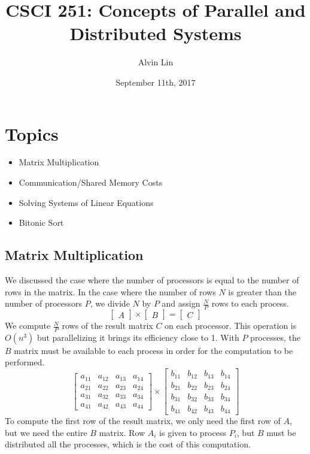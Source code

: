\documentclass{math}
\title{CSCI 251: Concepts of Parallel and Distributed Systems}
\author{Alvin Lin}
\date{September 11th, 2017}
\begin{document}
\maketitle

\section*{Topics}
\begin{itemize}
  \item Matrix Multiplication
  \item Communication/Shared Memory Costs
  \item Solving Systems of Linear Equations
  \item Bitonic Sort
\end{itemize}

\subsection*{Matrix Multiplication}
We discussed the case where the number of processors is equal to the number of
rows in the matrix. In the case where the number of rows \( N \) is greater
than the number of processors \( P \), we divide \( N \) by \( P \) and assign
\( \frac{N}{P} \) rows to each process.
\[ \begin{bmatrix}A\end{bmatrix}\times\begin{bmatrix}B\end{bmatrix} =
  \begin{bmatrix}C\end{bmatrix} \]
We compute \( \frac{N}{P} \) rows of the result matrix \( C \) on each
processor. This operation is \( O(n^3) \) but parallelizing it brings its
efficiency close to 1. With \( P \) processes, the \( B \) matrix must be
available to each process in order for the computation to be performed.
\[ \begin{bmatrix}
  a_{11} & a_{12} & a_{13} & a_{14} \\
  a_{21} & a_{22} & a_{23} & a_{24} \\
  a_{31} & a_{32} & a_{33} & a_{34} \\
  a_{41} & a_{42} & a_{43} & a_{44}
\end{bmatrix}\times\begin{bmatrix}
  b_{11} & b_{12} & b_{13} & b_{14} \\
  b_{21} & b_{22} & b_{23} & b_{24} \\
  b_{31} & b_{32} & b_{33} & b_{34} \\
  b_{41} & b_{42} & b_{43} & b_{44}
\end{bmatrix} \]
To compute the first row of the result matrix, we only need the first row of
\( A \), but we need the entire \( B \) matrix. Row \( A_i \) is given to
process \( P_i \), but \( B \) must be distributed all the processes, which is
the cost of this computation.
\end{document}
